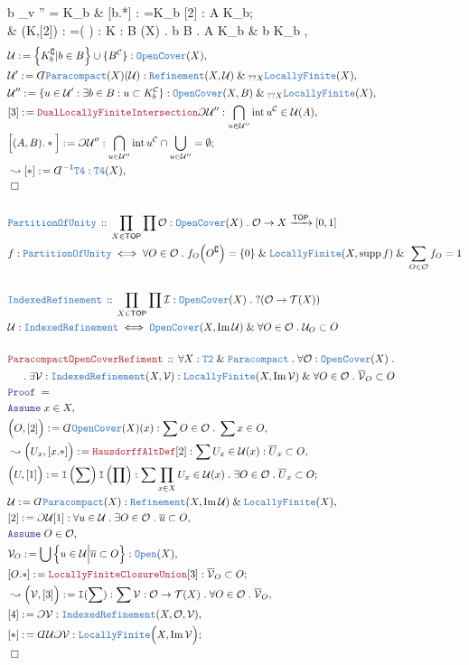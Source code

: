 \documentclass[12pt]{scrartcl}
\newcommand{\TYPE}[1]{\textcolor{NavyBlue}{\mathtt{#1}}}
\newcommand{\LOGIC}[1]{\textcolor{Blue}{\mathtt{#1}}}
\newcommand{\THM}[1]{\textcolor{Maroon}{\mathtt{#1}}}
\renewcommand{\.}{\; . \;}
\newcommand{\de}{: \kern 0.1pc =}
\newcommand{\Act}[1]{\left( #1 \right)}
\newcommand{\Theorem}[2]{& \THM{#1} \, :: \, #2 \\ & \Proof = \\ }
\newcommand{\DeclareType}[2]{& \TYPE{#1} \, :: \, #2 \\}
\newcommand{\DefineType}[3]{& #1 : \TYPE{#2} \iff #3 \\}
\newcommand{\NewLine}{\\ & \kern 1pc}
\newcommand{\Page}[1]{ \begin{align*} #1 \end{align*}   }
\newcommand{ \bd }{ \ByDef }
\renewcommand{\And}{\; \& \;}
\newcommand{\Intro}{\LOGIC{I}}
\DeclareMathOperator*{\im}{Im}
\DeclareMathOperator*{\supp}{supp}
\newcommand{\Arrow}{\xrightarrow}
\renewcommand{\c}{\complement}
\newcommand{\Say}[3]{& #1 \de #2 : #3, \\}
\newcommand{\Conclude}[3]{& #1 \de #2 : #3; \\}
\newcommand{\Derive}[3]{& \leadsto #1 \de #2 : #3, \\}
\newcommand{\AssumeIn}[2]{& \LOGIC{Assume} \; #1 \in #2, \\}
\newcommand{\QED}{\; \square}
\newcommand{\EndProof}{& \QED \\}
\newcommand{\ByDef}{\rotatebox[origin=c]{-180}{$D$}}%
\newcommand{\ByConstr}{\rotatebox[origin=c]{-180}{$C$}}%
\newcommand{\Proof}{\LOGIC{Proof} \; }
\newcommand{\C}{\mathcal{C}}
\DeclareMathOperator*{\intx}{int}
\newcommand{\TOP}{\mathsf{TOP}}
\newcommand{\T}{\mathcal{T}}
\newcommand{\U}{\mathcal{U}}
\renewcommand{\O}{\mathcal{O}}
\renewcommand{\O}{\mathcal{O}}
\begin{document}
{{		b \not \in \bigcup_{v \in {}''}   = K_b   }
	\Conclude{[b.*]}{\ByConstr K_b [2]}{A \subset \intx K_b}
	\Derive{\Big(K,[2]\Big)}{\Intro \Act{\sum}}{
		\sum K : B \to \TYPE{Closed}(X) \.
		\forall b \in B \.
		A \subset \intx K_b \And b \not \in K_b
	}
}\Page{
	\Say{\U}{ \Big\{ K_b^\c | b \in B   \Big\} \cup \{ B^\C \}}
	{
		\TYPE{OpenCover}(X)
	}
	\Say{\U'}{\bd \TYPE{Paracompact}(X)(\U)}
	{
		\TYPE{Refinement}(X,\U)
		\And_{??X}
		\TYPE{LocallyFinite}(X)
	}
	\Say{\U''}{ \{ u \in \U' : \exists b \in B : u \subset K_b^\C \}   }
	{
		\TYPE{OpenCover}(X,B) \And_{??X} \TYPE{LocallyFinite}(X)
	}
	\Say{[3]}{\THM{DualLocallyFiniteIntersection}\ByConstr \U''}
	{
		\bigcap_{u \in \U''} \intx u^\C \in \U(A)
	}
	\Conclude{\Big[(A,B).*\Big]}{ \ByConstr \U''  }
	{
		\bigcap_{u \in \U''} \intx u^\C \cap \bigcup_{u \in \U''} = \emptyset
	}
	\Derive{[*]}{\bd^{-1}\TYPE{T4}}{\TYPE{T4}(X)}
	\EndProof
	\\
	\DeclareType{PartitionOfUnity}
	{
		\prod_{X \in \TOP} 
		\prod \mathcal{O} : \TYPE{OpenCover}(X) \.
		\mathcal{O} \to X \Arrow{\TOP} [0,1]
	}
	\DefineType{f}{PartitionOfUnity}
	{
		\forall O \in \mathcal{O} \. 
		f_O\Big(O^\c\Big) = \{0\}
		\And
		\TYPE{LocallyFinite}(X,\supp f)
		\And
		\sum_{O \in \mathcal{O}} f_O = 1
	}
	\\
	\DeclareType{IndexedRefinement}{
		\prod_{X \in \TOP} 
		\prod \mathcal{I} : \TYPE{OpenCover}(X) \. 
		?(\O \to \T(X))
	}
	\DefineType{\U}{IndexedRefinement}{
		\TYPE{OpenCover}(X,\im \U) 
		\And 
		\forall O \in \mathcal{O} \. 
			\U_O \subset O
		}
	\\
	\Theorem{ParacompactOpenCoverRefiment}
	{
		\forall X : \TYPE{T2} \And \TYPE{Paracompact} \.
		\forall \mathcal{O} : \TYPE{OpenCover}(X) \. \NewLine \.
		\exists \mathcal{V} : 
		\TYPE{IndexedRefinement}(X,\mathcal{V}) :  
		\TYPE{LocallyFinite}(X, \im \mathcal{V} ) \And
		\forall O \in \mathcal{O} \.
		\overline{\mathcal{V}}_O \subset O
	}
	\AssumeIn{x}{X}
	\Say{\Big(O,[2]\Big)}{\bd \TYPE{OpenCover}(X)(x)}
	{
		\sum O \in \mathcal{O} \.
		\sum x \in O
	}
	\Derive{\Big(U_x,[x.*]\Big)}{\THM{HausdorffAltDef}[2]}
	{
		\sum U_x \in \U(x) :  
		\overline{U}_x \subset O
	}
	\Conclude{\Big(U,[1] \Big)}{\Intro \Act{\sum} \Intro \Act{\prod}}
	{
		\sum \prod_{x \in X} U_x \in \U(x) \.
		\exists O \in \mathcal{O} \.
		\overline{U}_x \subset O
	}
	\Say{\U}{\bd \TYPE{Paracompact}(X)}
	{
		\TYPE{Refinement}(X,\im \U) \And \TYPE{LocallyFinite}(X)
	}
	\Say{[2]}{\ByConstr \U[1]}
	{
		\forall u \in \U \. 
		\exists O \in \mathcal{O} \.
		\overline{u} \subset O
	}
	\AssumeIn{O}{\mathcal{O}}
	\Say{\mathcal{V}_O}{\bigcup \Big\{ u \in \mathcal{U} \Big| \overline{u} \subset O  \Big\}}
	{
		\TYPE{Open}(X)
	}
	\Conclude{[O.*]}{\THM{LocallyFiniteClosureUnion}[3]}
	{
		\overline{\mathcal{V}}_O \subset O
	}
	\Derive{\Big(\mathcal{V},[3]\Big)}{\Intro(\sum)}
	{
		\sum \mathcal{V} : \mathcal{O} \to \T(X) \.
		\forall O \in \mathcal{O} \. 
		\overline{\mathcal{V}}_O
	}
	\Say{[4]}{\ByConstr \mathcal{V}}{\TYPE{IndexedRefinement}(X,\mathcal{O},\mathcal{V})}
	\Conclude{[*]}{\bd \U \ByConstr \mathcal{V}}
	{
		\TYPE{LocallyFinite}\Big(X,\im \mathcal{V}\Big)
	}
	\EndProof
}
\end{document}

